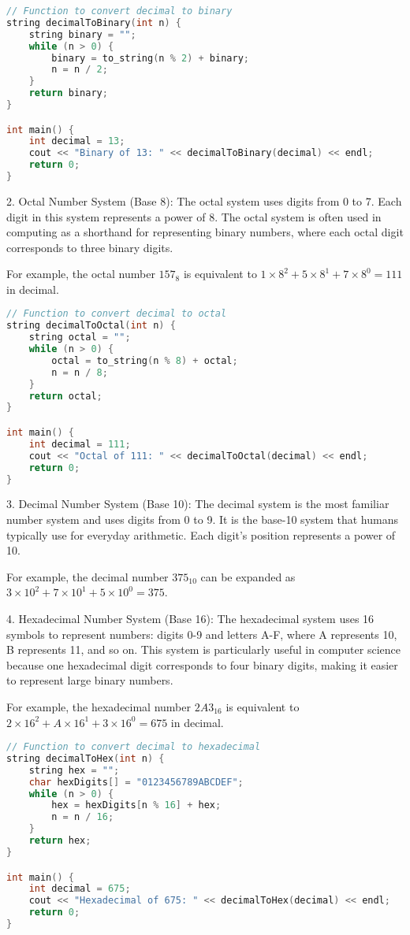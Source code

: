 \documentclass[10pt,a4paper]{article}
\begin{document}
\begin{lstlisting}[language=C++]
// Function to convert decimal to binary
string decimalToBinary(int n) {
    string binary = "";
    while (n > 0) {
        binary = to_string(n % 2) + binary;
        n = n / 2;
    }
    return binary;
}

int main() {
    int decimal = 13;
    cout << "Binary of 13: " << decimalToBinary(decimal) << endl;
    return 0;
}
\end{lstlisting}

2. Octal Number System (Base 8):
   The octal system uses digits from 0 to 7. Each digit in this system represents a power of 8. The octal system is often used in computing as a shorthand for representing binary numbers, where each octal digit corresponds to three binary digits.

   For example, the octal number \(157_8\) is equivalent to \(1 \times 8^2 + 5 \times 8^1 + 7 \times 8^0 = 111\) in decimal.

\begin{lstlisting}[language=C++]
// Function to convert decimal to octal
string decimalToOctal(int n) {
    string octal = "";
    while (n > 0) {
        octal = to_string(n % 8) + octal;
        n = n / 8;
    }
    return octal;
}

int main() {
    int decimal = 111;
    cout << "Octal of 111: " << decimalToOctal(decimal) << endl;
    return 0;
}
\end{lstlisting}

3. Decimal Number System (Base 10):
   The decimal system is the most familiar number system and uses digits from 0 to 9. It is the base-10 system that humans typically use for everyday arithmetic. Each digit's position represents a power of 10.

   For example, the decimal number \(375_{10}\) can be expanded as \(3 \times 10^2 + 7 \times 10^1 + 5 \times 10^0 = 375\).

4. Hexadecimal Number System (Base 16):
   The hexadecimal system uses 16 symbols to represent numbers: digits 0-9 and letters A-F, where A represents 10, B represents 11, and so on. This system is particularly useful in computer science because one hexadecimal digit corresponds to four binary digits, making it easier to represent large binary numbers.

   For example, the hexadecimal number \(2A3_{16}\) is equivalent to \(2 \times 16^2 + A \times 16^1 + 3 \times 16^0 = 675\) in decimal.

\begin{lstlisting}[language=C++]
// Function to convert decimal to hexadecimal
string decimalToHex(int n) {
    string hex = "";
    char hexDigits[] = "0123456789ABCDEF";
    while (n > 0) {
        hex = hexDigits[n % 16] + hex;
        n = n / 16;
    }
    return hex;
}

int main() {
    int decimal = 675;
    cout << "Hexadecimal of 675: " << decimalToHex(decimal) << endl;
    return 0;
}
\end{lstlisting}
\end{document}
